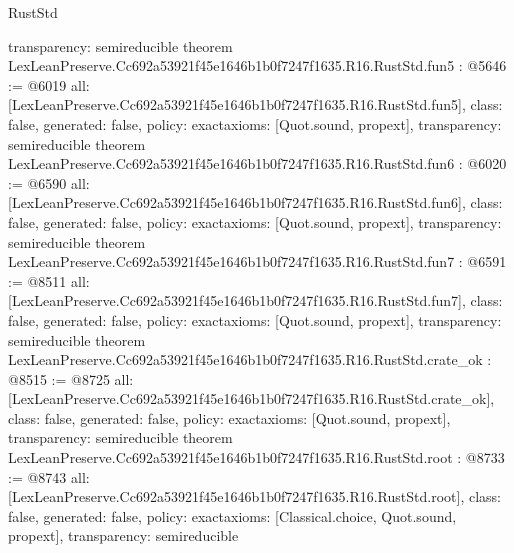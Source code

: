\begin{lexlean}{RustStd}
\begin{coremodule}
{  transparency: semireducible
}
theorem LexLeanPreserve.Cc692a53921f45e1646b1b0f7247f1635.R16.RustStd.fun5 : @5646 := @6019 {
  all: [LexLeanPreserve.Cc692a53921f45e1646b1b0f7247f1635.R16.RustStd.fun5],
  class: false,
  generated: false,
  policy: exact{axioms: [Quot.sound, propext]},
  transparency: semireducible
}
theorem LexLeanPreserve.Cc692a53921f45e1646b1b0f7247f1635.R16.RustStd.fun6 : @6020 := @6590 {
  all: [LexLeanPreserve.Cc692a53921f45e1646b1b0f7247f1635.R16.RustStd.fun6],
  class: false,
  generated: false,
  policy: exact{axioms: [Quot.sound, propext]},
  transparency: semireducible
}
theorem LexLeanPreserve.Cc692a53921f45e1646b1b0f7247f1635.R16.RustStd.fun7 : @6591 := @8511 {
  all: [LexLeanPreserve.Cc692a53921f45e1646b1b0f7247f1635.R16.RustStd.fun7],
  class: false,
  generated: false,
  policy: exact{axioms: [Quot.sound, propext]},
  transparency: semireducible
}
theorem LexLeanPreserve.Cc692a53921f45e1646b1b0f7247f1635.R16.RustStd.crate_ok : @8515 := @8725 {
  all: [LexLeanPreserve.Cc692a53921f45e1646b1b0f7247f1635.R16.RustStd.crate_ok],
  class: false,
  generated: false,
  policy: exact{axioms: [Quot.sound, propext]},
  transparency: semireducible
}
theorem LexLeanPreserve.Cc692a53921f45e1646b1b0f7247f1635.R16.RustStd.root : @8733 := @8743 {
  all: [LexLeanPreserve.Cc692a53921f45e1646b1b0f7247f1635.R16.RustStd.root],
  class: false,
  generated: false,
  policy: exact{axioms: [Classical.choice, Quot.sound, propext]},
  transparency: semireducible
}


\end{coremodule}
\end{lexlean}
